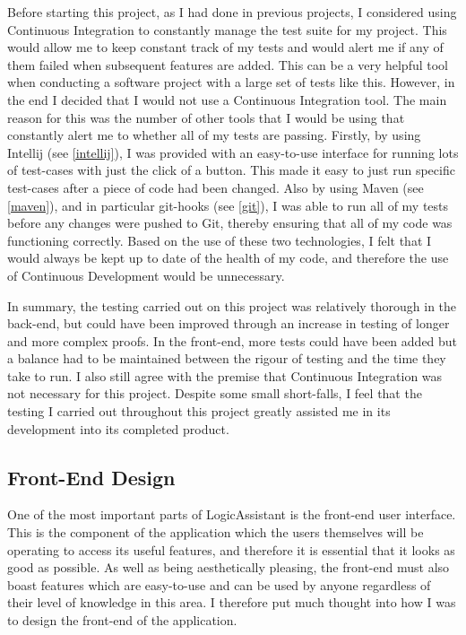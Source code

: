 Before starting this project, as I had done in previous projects, I considered using Continuous Integration to constantly manage the test suite for my project. This would allow me to keep constant track of my tests and would alert me if any of them failed when subsequent features are added. This can be a very helpful tool when conducting a software project with a large set of tests like this. However, in the end I decided that I would not use a Continuous Integration tool. The main reason for this was the number of other tools that I would be using that constantly alert me to whether all of my tests are passing. Firstly, by using Intellij (see \ref{intellij}), I was provided with an easy-to-use interface for running lots of test-cases with just the click of a button. This made it easy to just run specific test-cases after a piece of code had been changed. Also by using Maven (see \ref{maven}), and in particular git-hooks (see \ref{git}), I was able to run all of my tests before any changes were pushed to Git, thereby ensuring that all of my code was functioning correctly. Based on the use of these two technologies, I felt that I would always be kept up to date of the health of my code, and therefore the use of Continuous Development would be unnecessary.

In summary, the testing carried out on this project was relatively thorough in the back-end, but could have been improved through an increase in testing of longer and more complex proofs. In the front-end, more tests could have been added but a balance had to be maintained between the rigour of testing and the time they take to run. I also still agree with the premise that Continuous Integration was not necessary for this project. Despite some small short-falls, I feel that the testing I carried out throughout this project greatly assisted me in its development into its completed product.

\subsection{Front-End Design}

One of the most important parts of LogicAssistant is the front-end user interface. This is the component of the application which the users themselves will be operating to access its useful features, and therefore it is essential that it looks as good as possible. As well as being aesthetically pleasing, the front-end must also boast features which are easy-to-use and can be used by anyone regardless of their level of knowledge in this area. I therefore put much thought into how I was to design the front-end of the application.

